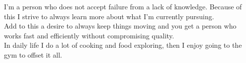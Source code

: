 \documentclass[a4paper]{twentysecondcv} %
\begin{document}




{
\hspace{1em}
I'm a person who does not accept failure from a lack of knowledge. Because of this I strive to always learn more about what I'm currently pursuing.\\

Add to this a desire to always keep things moving and you get a person who works fast and efficiently without compromising quality.\\

In daily life I do a lot of cooking and food exploring, then I enjoy going to the gym to offset it all.}


    
    

\makeprofile %

\end{document}
